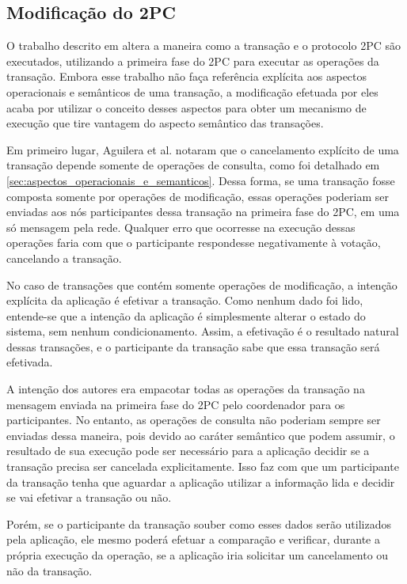 \documentclass[11pt,twoside,a4paper]{book}
\begin{document}

\subsection{Modificação do 2PC}
\label{subsec:modificacao_2pc}
O trabalho descrito em \cite{sinfonia} altera a maneira como a transação e o protocolo 2PC são executados, utilizando a primeira fase do 2PC para executar as operações da transação. Embora esse trabalho não faça referência explícita aos aspectos operacionais e semânticos de uma transação, a modificação efetuada por eles acaba por utilizar o conceito desses aspectos para obter um mecanismo de execução que tire vantagem do aspecto semântico das transações.

Em primeiro lugar, Aguilera et al. notaram que o cancelamento explícito de uma transação depende somente de operações de consulta, como foi detalhado em \ref{sec:aspectos_operacionais_e_semanticos}. Dessa forma, se uma transação fosse composta somente por operações de modificação, essas operações poderiam ser enviadas aos nós participantes dessa transação na primeira fase do 2PC, em uma só mensagem pela rede. Qualquer erro que ocorresse na execução dessas operações faria com que o participante respondesse negativamente à votação, cancelando a transação.

No caso de transações que contém somente operações de modificação, a intenção explícita da aplicação é efetivar a transação. Como nenhum dado foi lido, entende-se que a intenção da aplicação é simplesmente alterar o estado do sistema, sem nenhum condicionamento. Assim, a efetivação é o resultado natural dessas transações, e o participante da transação sabe que essa transação será efetivada.

A intenção dos autores era empacotar todas as operações da transação na mensagem enviada na primeira fase do 2PC pelo coordenador para os participantes. No entanto, as operações de consulta não poderiam sempre ser enviadas dessa maneira, pois devido ao caráter semântico que podem assumir, o resultado de sua execução pode ser necessário para a aplicação decidir se a transação precisa ser cancelada explicitamente. Isso faz com que um participante da transação tenha que aguardar a aplicação utilizar a informação lida e decidir se vai efetivar a transação ou não.

Porém, se o participante da transação souber como esses dados serão utilizados pela aplicação, ele mesmo poderá efetuar a comparação e verificar, durante a própria execução da operação, se a aplicação iria solicitar um cancelamento ou não da transação.
\end{document}
